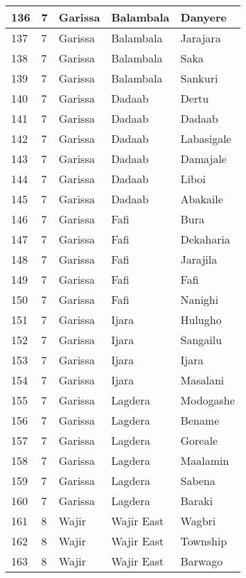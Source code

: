 \begin{table}[!ht]
\begin{tabular}{|l|l|l|l|l|}
        136 & 7 & Garissa & Balambala & Danyere \\ \hline
        137 & 7 & Garissa & Balambala & Jarajara \\ \hline
        138 & 7 & Garissa & Balambala & Saka \\ \hline
        139 & 7 & Garissa & Balambala & Sankuri \\ \hline
        140 & 7 & Garissa & Dadaab & Dertu \\ \hline
        141 & 7 & Garissa & Dadaab & Dadaab \\ \hline
        142 & 7 & Garissa & Dadaab & Labasigale \\ \hline
        143 & 7 & Garissa & Dadaab & Damajale \\ \hline
        144 & 7 & Garissa & Dadaab & Liboi \\ \hline
        145 & 7 & Garissa & Dadaab & Abakaile \\ \hline
        146 & 7 & Garissa & Fafi & Bura \\ \hline
        147 & 7 & Garissa & Fafi & Dekaharia \\ \hline
        148 & 7 & Garissa & Fafi & Jarajila \\ \hline
        149 & 7 & Garissa & Fafi & Fafi \\ \hline
        150 & 7 & Garissa & Fafi & Nanighi \\ \hline
        151 & 7 & Garissa & Ijara & Hulugho \\ \hline
        152 & 7 & Garissa & Ijara & Sangailu \\ \hline
        153 & 7 & Garissa & Ijara & Ijara \\ \hline
        154 & 7 & Garissa & Ijara & Masalani \\ \hline
        155 & 7 & Garissa & Lagdera & Modogashe \\ \hline
        156 & 7 & Garissa & Lagdera & Bename \\ \hline
        157 & 7 & Garissa & Lagdera & Goreale \\ \hline
        158 & 7 & Garissa & Lagdera & Maalamin \\ \hline
        159 & 7 & Garissa & Lagdera & Sabena \\ \hline
        160 & 7 & Garissa & Lagdera & Baraki \\ \hline
        161 & 8 & Wajir & Wajir East & Wagbri \\ \hline
        162 & 8 & Wajir & Wajir East & Township \\ \hline
        163 & 8 & Wajir & Wajir East & Barwago \\ \hline

\end{tabular}
\end{table}

